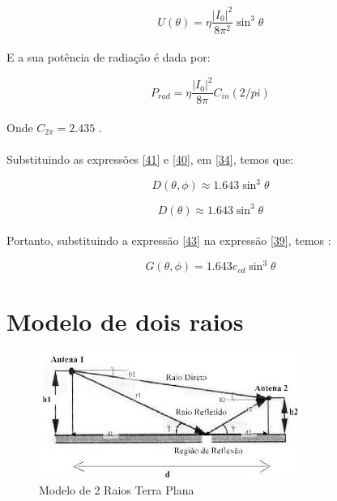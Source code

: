 \begin{equation}
    U(\theta) = \eta \frac{|I_0|^2}{8\pi^2}\sin^3\theta
    \label{40}
\end{equation}

\paragraph{}E a sua potência de radiação é dada por:

\begin{equation}
    P_{rad} = \eta \frac{|I_0|^2}{8\pi}C_{in}(2/pi)
    \label{41}
\end{equation}

\paragraph{}
Onde $C_{2\pi} = 2.435$ \citep{balanis}.


\paragraph{}Substituindo as expressões \ref{41} e \ref{40}, em \ref{34}, temos que:

\begin{equation}
    D(\theta,\phi) \approx 1.643\sin^3 \theta
    \label{42}
\end{equation}

\begin{equation}
    D(\theta) \approx 1.643\sin^3 \theta
    \label{43}
\end{equation}



\paragraph{}Portanto, substituindo a expressão \ref{43} na expressão \ref{39}, temos :

\begin{equation}
\label{Ganho}
    G(\theta,\phi) = 1.643e_{cd}\sin^3\theta
\end{equation}

\section{Modelo de dois raios}

\FloatBarrier
\begin{figure}[!htp]
\centering
\includegraphics[scale = 0.8]{Figuras/images.jpg}
\caption{Modelo de 2 Raios Terra Plana}
\end{figure}
\FloatBarrier



